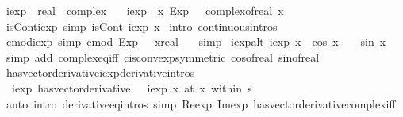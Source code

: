\documentclass[leqno]{article}
\theoremstyle{definition}
\begin{document}
\begin{isabellebody}
\isamarkupfalse%
\ iexp\ {\isacharcolon}{\isacharcolon}\ {\isachardoublequoteopen}real\ {\isasymRightarrow}\ complex{\isachardoublequoteclose}\ \isanewline
\ \ {\isachardoublequoteopen}iexp\ {\isasymequiv}\ {\isacharparenleft}{\isasymlambda}x{\isachardot}\ Exp\ {\isacharparenleft}{\isasymi}\ {\isacharasterisk}\ complex{\isacharunderscore}of{\isacharunderscore}real\ x{\isacharparenright}{\isacharparenright}{\isachardoublequoteclose}\isanewline
\isanewline
{}\isamarkupfalse%
\ isCont{\isacharunderscore}iexp\ {\isacharbrackleft}simp{\isacharbrackright}{\isacharcolon}\ {\isachardoublequoteopen}isCont\ iexp\ x{\isachardoublequoteclose}\isanewline
{}\isamarkupfalse%
\ {\isacharparenleft}intro\ continuous{\isacharunderscore}intros{\isacharparenright}%
\isanewline
{}\isamarkupfalse%
\ cmod{\isacharunderscore}iexp\ {\isacharbrackleft}simp{\isacharbrackright}{\isacharcolon}\ {\isachardoublequoteopen}cmod\ {\isacharparenleft}Exp\ {\isacharparenleft}{\isasymi}\ {\isacharasterisk}\ {\isacharparenleft}x{\isacharcolon}{\isacharcolon}real{\isacharparenright}{\isacharparenright}{\isacharparenright}\ {\isacharequal}\ {}{\isachardoublequoteclose}\isanewline
{}\isamarkupfalse%
\ simp%
\isanewline
{}\isamarkupfalse%
\ iexp{\isacharunderscore}alt{\isacharcolon}\ {\isachardoublequoteopen}iexp\ x\ {\isacharequal}\ cos\ x\ {\isacharplus}\ {\isasymi}\ {\isacharasterisk}\ sin\ x{\isachardoublequoteclose}\isanewline
{}\isamarkupfalse%
\ {\isacharparenleft}simp\ add{\isacharcolon}\ complex{\isacharunderscore}eq{\isacharunderscore}iff\ cis{\isacharunderscore}conv{\isacharunderscore}exp{\isacharbrackleft}symmetric{\isacharbrackright}\ cos{\isacharunderscore}of{\isacharunderscore}real\ sin{\isacharunderscore}of{\isacharunderscore}real{\isacharparenright}%
\isanewline
{}\isamarkupfalse%
\ has{\isacharunderscore}vector{\isacharunderscore}derivative{\isacharunderscore}iexp{\isacharbrackleft}derivative{\isacharunderscore}intros{\isacharbrackright}{\isacharcolon}\isanewline
\ \ {\isachardoublequoteopen}{\isacharparenleft}iexp\ has{\isacharunderscore}vector{\isacharunderscore}derivative\ {\isasymi}\ {\isacharasterisk}\ iexp\ x{\isacharparenright}\ {\isacharparenleft}at\ x\ within\ s{\isacharparenright}{\isachardoublequoteclose}\isanewline
{}\isamarkupfalse%
\ {\isacharparenleft}auto\ intro{\isacharbang}{\isacharcolon}\ derivative{\isacharunderscore}eq{\isacharunderscore}intros\ simp{\isacharcolon}\ Re{\isacharunderscore}exp\ Im{\isacharunderscore}exp\ has{\isacharunderscore}vector{\isacharunderscore}derivative{\isacharunderscore}complex{\isacharunderscore}iff{\isacharparenright}%
\end{isabellebody}
\end{document}

